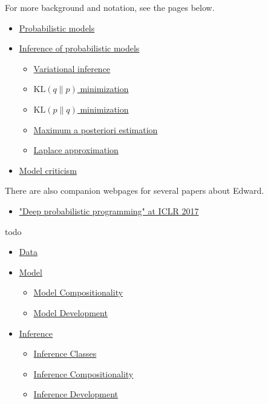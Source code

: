 For more background and notation, see the pages below.
\begin{itemize}
  \item \href{model}{Probabilistic models}
  \item \href{inference}{Inference of probabilistic models}
  \begin{itemize}
   \item \href{variational-inference}{Variational inference}
   \item \href{klqp}{$\text{KL}(q\|p)$ minimization}
   \item \href{klpq}{$\text{KL}(p\|q)$ minimization}
   \item \href{map}{Maximum a posteriori estimation}
   \item \href{map-laplace}{Laplace approximation}
  \end{itemize}
  \item \href{criticism}{Model criticism}
\end{itemize}

There are also companion webpages for several papers about Edward.
\begin{itemize}
\item
\href{/iclr2017}{"Deep probabilistic programming" at ICLR 2017}
\end{itemize}


todo
\begin{itemize}
\item \href{data}{Data}
\item \href{model-api}{Model}
  \begin{itemize}
  \item \href{model-compositionality}{Model Compositionality}
  \item \href{model-development}{Model Development}
  \end{itemize}
\item \href{inference-api}{Inference}
  \begin{itemize}
  \item \href{inference-classes}{Inference Classes}
  \item \href{inference-compositionality}{Inference Compositionality}
  \item \href{inference-development}{Inference Development}
  \end{itemize}
\end{itemize}
